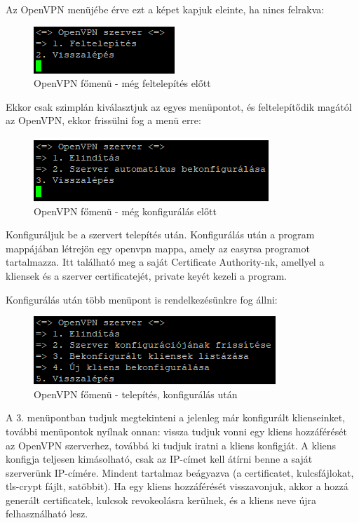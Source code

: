 \pagebreak


Az OpenVPN menüjébe érve ezt a képet kapjuk eleinte, ha nincs felrakva:

\begin{figure}[h]
\centering
\includegraphics[scale=1]{images/openvpn_install.png}
\caption{OpenVPN főmenü - még feltelepítés előtt}
\end{figure}

Ekkor csak szimplán kiválasztjuk az egyes menüpontot, és feltelepítődik magától az OpenVPN, ekkor frissülni fog a menü erre:

\begin{figure}[h]
\centering
\includegraphics[scale=1]{images/openvpn_preconfig.png}
\caption{OpenVPN főmenü - még konfigurálás előtt}
\end{figure}

Konfiguráljuk be a szervert telepítés után. Konfigurálás után a program mappájában létrejön egy openvpn mappa, amely az easyrsa programot tartalmazza. Itt található meg a saját Certificate Authority-nk, amellyel a kliensek és a szerver certificatejét, private keyét kezeli a program.

Konfigurálás után több menüpont is rendelkezésünkre fog állni:

\begin{figure}[h]
\centering
\includegraphics[scale=1]{images/openvpn_after_install.png}
\caption{OpenVPN főmenü - telepítés, konfigurálás után}
\end{figure}

A 3. menüpontban tudjuk megtekinteni a jelenleg már konfigurált klienseinket, további menüpontok nyílnak onnan: vissza tudjuk vonni egy kliens hozzáférését az OpenVPN szerverhez, továbbá ki tudjuk iratni a kliens konfigját. A kliens konfigja teljesen kimásolható, csak az IP-címet kell átírni benne a saját szerverünk IP-címére. Mindent tartalmaz beágyazva (a certificatet, kulcsfájlokat, tls-crypt fájlt, satöbbit).
Ha egy kliens hozzáférését visszavonjuk, akkor a hozzá generált certificatek, kulcsok revokeolásra kerülnek, és a kliens neve újra felhasználható lesz.


